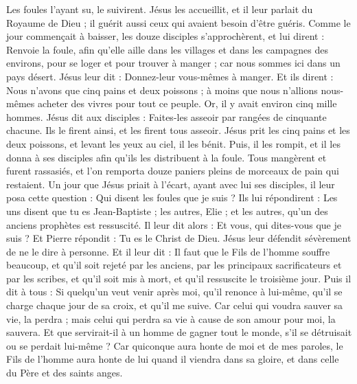 \begin{multicols}{2}
Les foules l’ayant su, le suivirent. Jésus les accueillit, et il leur parlait du Royaume de Dieu ; il guérit aussi ceux qui avaient besoin d'être guéris.
Comme le jour commençait à baisser, les douze disciples s’approchèrent, et lui dirent : Renvoie la foule, afin qu’elle aille dans les villages et dans les campagnes des environs, pour se loger et pour trouver à manger ; car nous sommes ici dans un pays désert.
Jésus leur dit : Donnez-leur vous-mêmes à manger. Et ils dirent : Nous n'avons que cinq pains et deux poissons ; à moins que nous n'allions nous-mêmes acheter des vivres pour tout ce peuple.
Or, il y avait environ cinq mille hommes. Jésus dit aux disciples : Faites-les asseoir par rangées de cinquante chacune.
Ils le firent ainsi, et les firent tous asseoir.
Jésus prit les cinq pains et les deux poissons, et levant les yeux au ciel, il les bénit. Puis, il les rompit, et il les donna à ses disciples afin qu'ils les distribuent à la foule.
Tous mangèrent et furent rassasiés, et l’on remporta douze paniers pleins de morceaux de pain qui restaient.
Un jour que Jésus priait à l'écart, ayant avec lui ses disciples, il leur posa cette question : Qui disent les foules que je suis ?
Ils lui répondirent : Les uns disent que tu es Jean-Baptiste ; les autres, Elie ; et les autres, qu’un des anciens prophètes est ressuscité.
Il leur dit alors : Et vous, qui dites-vous que je suis ? Et Pierre répondit : Tu es le Christ de Dieu.
Jésus leur défendit sévèrement de ne le dire à personne.
Et il leur dit : Il faut que le Fils de l'homme souffre beaucoup, et qu'il soit rejeté par les anciens, par les principaux sacrificateurs et par les scribes, et qu'il soit mis à mort, et qu'il ressuscite le troisième jour.
Puis il dit à tous : Si quelqu'un veut venir après moi, qu'il renonce à lui-même, qu'il se charge chaque jour de sa croix, et qu’il me suive.
Car celui qui voudra sauver sa vie, la perdra ; mais celui qui perdra sa vie à cause de son amour pour moi, la sauvera.
Et que servirait-il à un homme de gagner tout le monde, s'il se détruisait ou se perdait lui-même ?
Car quiconque aura honte de moi et de mes paroles, le Fils de l'homme aura honte de lui quand il viendra dans sa gloire, et dans celle du Père et des saints anges.

\end{multicols}
